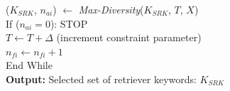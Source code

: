 \begin{algorithm}
\hspace*{6mm}        ($K_{SRK}$, $n_{ai}$) $\leftarrow$ \textit{Max-Diversity}($K_{SRK}$, $T$, $X$) \\
\hspace*{6mm}        If ($n_{ai} = 0$):  STOP    \\ 
\hspace*{6mm}        $T \leftarrow T + \Delta$ (increment constraint parameter) \\ 
\hspace*{6mm}        $n_{fi} \leftarrow n_{fi} + 1 $ \\ 
\hspace*{2mm}       End While \\ 
\textbf{Output:} Selected set of retriever keywords: $K_{SRK} $  
\end{algorithm}




